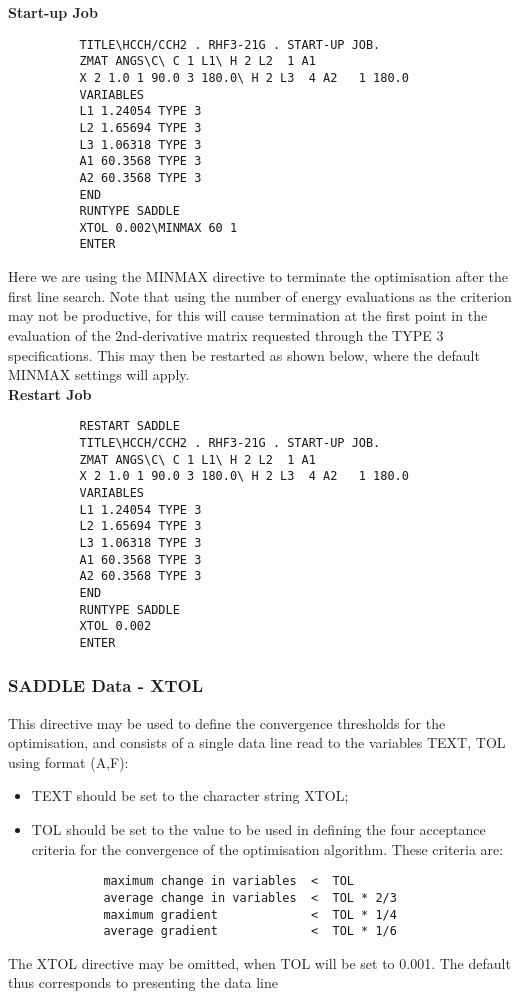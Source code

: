 \documentclass[11pt,fleqn]{article}
\begin{document}
{\bf Start-up Job}
{
\footnotesize
\begin{verbatim}
          TITLE\HCCH/CCH2 . RHF3-21G . START-UP JOB.
          ZMAT ANGS\C\ C 1 L1\ H 2 L2  1 A1
          X 2 1.0 1 90.0 3 180.0\ H 2 L3  4 A2   1 180.0
          VARIABLES
          L1 1.24054 TYPE 3
          L2 1.65694 TYPE 3
          L3 1.06318 TYPE 3
          A1 60.3568 TYPE 3
          A2 60.3568 TYPE 3
          END 
          RUNTYPE SADDLE
          XTOL 0.002\MINMAX 60 1
          ENTER
\end{verbatim}
}
Here we are using the MINMAX directive to terminate the
optimisation after the first line search. Note that using the
number of energy evaluations as the criterion may not
be productive, for  this will cause termination at the first
point in the evaluation of the 2nd-derivative matrix requested through
the TYPE 3 specifications.  This may then be restarted
as shown below, where the default MINMAX settings will apply.\\

{\bf Restart Job}
{
\footnotesize
\begin{verbatim}
          RESTART SADDLE
          TITLE\HCCH/CCH2 . RHF3-21G . START-UP JOB.
          ZMAT ANGS\C\ C 1 L1\ H 2 L2  1 A1
          X 2 1.0 1 90.0 3 180.0\ H 2 L3  4 A2   1 180.0
          VARIABLES
          L1 1.24054 TYPE 3
          L2 1.65694 TYPE 3
          L3 1.06318 TYPE 3
          A1 60.3568 TYPE 3
          A2 60.3568 TYPE 3
          END 
          RUNTYPE SADDLE
          XTOL 0.002
          ENTER
\end{verbatim}
}

\subsubsection[SADDLE Data - XTOL]{SADDLE Data - XTOL}

This directive may be used to define the convergence thresholds
for the optimisation, and consists of a single data line
read to the variables TEXT, TOL using format (A,F):
\begin{itemize}
\item TEXT should be set to the character string XTOL;
\item TOL should be set to the value to be used in
defining the four acceptance criteria for the convergence of the
optimisation algorithm. These criteria are:

{
\footnotesize
\begin{verbatim}
          maximum change in variables  <  TOL
          average change in variables  <  TOL * 2/3
          maximum gradient             <  TOL * 1/4
          average gradient             <  TOL * 1/6
\end{verbatim}
}
\end{itemize}
The XTOL directive may be omitted, when TOL will be set to 0.001.
The default thus corresponds to presenting the data line
\end{document}
